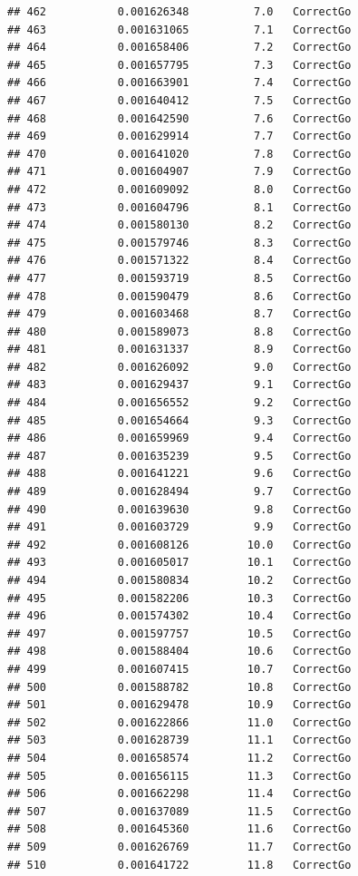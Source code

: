 \documentclass[
]{article}
\begin{document}
\begin{verbatim}
## 462           0.001626348          7.0   CorrectGo
## 463           0.001631065          7.1   CorrectGo
## 464           0.001658406          7.2   CorrectGo
## 465           0.001657795          7.3   CorrectGo
## 466           0.001663901          7.4   CorrectGo
## 467           0.001640412          7.5   CorrectGo
## 468           0.001642590          7.6   CorrectGo
## 469           0.001629914          7.7   CorrectGo
## 470           0.001641020          7.8   CorrectGo
## 471           0.001604907          7.9   CorrectGo
## 472           0.001609092          8.0   CorrectGo
## 473           0.001604796          8.1   CorrectGo
## 474           0.001580130          8.2   CorrectGo
## 475           0.001579746          8.3   CorrectGo
## 476           0.001571322          8.4   CorrectGo
## 477           0.001593719          8.5   CorrectGo
## 478           0.001590479          8.6   CorrectGo
## 479           0.001603468          8.7   CorrectGo
## 480           0.001589073          8.8   CorrectGo
## 481           0.001631337          8.9   CorrectGo
## 482           0.001626092          9.0   CorrectGo
## 483           0.001629437          9.1   CorrectGo
## 484           0.001656552          9.2   CorrectGo
## 485           0.001654664          9.3   CorrectGo
## 486           0.001659969          9.4   CorrectGo
## 487           0.001635239          9.5   CorrectGo
## 488           0.001641221          9.6   CorrectGo
## 489           0.001628494          9.7   CorrectGo
## 490           0.001639630          9.8   CorrectGo
## 491           0.001603729          9.9   CorrectGo
## 492           0.001608126         10.0   CorrectGo
## 493           0.001605017         10.1   CorrectGo
## 494           0.001580834         10.2   CorrectGo
## 495           0.001582206         10.3   CorrectGo
## 496           0.001574302         10.4   CorrectGo
## 497           0.001597757         10.5   CorrectGo
## 498           0.001588404         10.6   CorrectGo
## 499           0.001607415         10.7   CorrectGo
## 500           0.001588782         10.8   CorrectGo
## 501           0.001629478         10.9   CorrectGo
## 502           0.001622866         11.0   CorrectGo
## 503           0.001628739         11.1   CorrectGo
## 504           0.001658574         11.2   CorrectGo
## 505           0.001656115         11.3   CorrectGo
## 506           0.001662298         11.4   CorrectGo
## 507           0.001637089         11.5   CorrectGo
## 508           0.001645360         11.6   CorrectGo
## 509           0.001626769         11.7   CorrectGo
## 510           0.001641722         11.8   CorrectGo

\end{verbatim}
\end{document}
